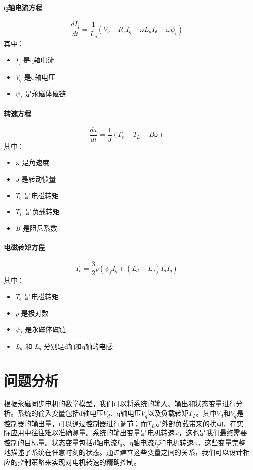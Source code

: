 \documentclass[12pt,a4paper,UTF8]{article}
\begin{document}
\paragraph{q轴电流方程}
\begin{equation}
\frac{dI_q}{dt} = \frac{1}{L_q}(V_q - R_sI_q - \omega L_dI_d - \omega\psi_f)
\end{equation}
其中：
\begin{itemize}
\item $I_q$ 是q轴电流
\item $V_q$ 是q轴电压
\item $\psi_f$ 是永磁体磁链
\end{itemize}

\paragraph{转速方程}
\begin{equation}
\frac{d\omega}{dt} = \frac{1}{J}(T_e - T_L - B\omega)
\end{equation}
其中：
\begin{itemize}
\item $\omega$ 是角速度
\item $J$ 是转动惯量
\item $T_e$ 是电磁转矩
\item $T_L$ 是负载转矩
\item $B$ 是阻尼系数
\end{itemize}

\paragraph{电磁转矩方程}
\begin{equation}
T_e = \frac{3}{2}p(\psi_fI_q + (L_d - L_q)I_dI_q)
\end{equation}
其中：
\begin{itemize}
\item $T_e$ 是电磁转矩
\item $p$ 是极对数
\item $\psi_f$ 是永磁体磁链
\item $L_d$ 和 $L_q$ 分别是d轴和q轴的电感
\end{itemize}

\section{问题分析}

根据永磁同步电机的数学模型\cite{DGJS202306019}，我们可以将系统的输入、输出和状态变量进行分析。系统的输入变量包括d轴电压$V_d$、q轴电压$V_q$以及负载转矩$T_L$。其中$V_d$和$V_q$是控制器的输出量，可以通过控制器进行调节；而$T_L$是外部负载带来的扰动，在实际应用中往往难以准确测量。系统的输出变量是电机转速$\omega$，这也是我们最终需要控制的目标量。状态变量包括d轴电流$I_d$、q轴电流$I_q$和电机转速$\omega$，这些变量完整地描述了系统在任意时刻的状态。通过建立这些变量之间的关系，我们可以设计相应的控制策略来实现对电机转速的精确控制。
\end{document}
